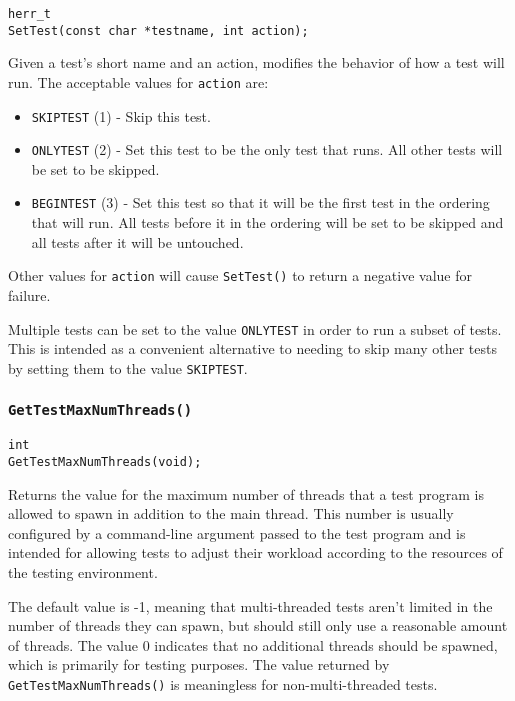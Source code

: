 \documentclass[../HDF5_RFC.tex]{subfiles}
\begin{document}
\begin{verbatim}
herr_t
SetTest(const char *testname, int action);
\end{verbatim}

Given a test's short name and an action, modifies the behavior of how a test will run. The acceptable
values for \texttt{action} are:

\begin{itemize}

    \item \texttt{SKIPTEST} (1) - Skip this test.
    \item \texttt{ONLYTEST} (2) - Set this test to be the only test that runs. All other tests will
          be set to be skipped.
    \item \texttt{BEGINTEST} (3) - Set this test so that it will be the first test in the ordering
          that will run. All tests before it in the ordering will be set to be skipped and all tests
          after it will be untouched.

\end{itemize}

Other values for \texttt{action} will cause \texttt{SetTest()} to return a negative value for failure.

Multiple tests can be set to the value \texttt{ONLYTEST} in order to run a subset of tests. This is
intended as a convenient alternative to needing to skip many other tests by setting them to the value
\texttt{SKIPTEST}.

\subsubsection{\texttt{GetTestMaxNumThreads()}}
\label{apdx:testframe_gettestmaxnumthreads}

\begin{verbatim}
int
GetTestMaxNumThreads(void);
\end{verbatim}

Returns the value for the maximum number of threads that a test program is allowed to spawn in addition
to the main thread. This number is usually configured by a command-line argument passed to
the test program and is intended for allowing tests to adjust their workload according to the resources
of the testing environment.

The default value is -1, meaning that multi-threaded tests aren't limited in the number of threads they
can spawn, but should still only use a reasonable amount of threads. The value 0 indicates that no additional threads should be spawned, which is primarily for testing purposes. The value returned by \texttt{GetTestMaxNumThreads()} is meaningless for non-multi-threaded tests.
\end{document}

